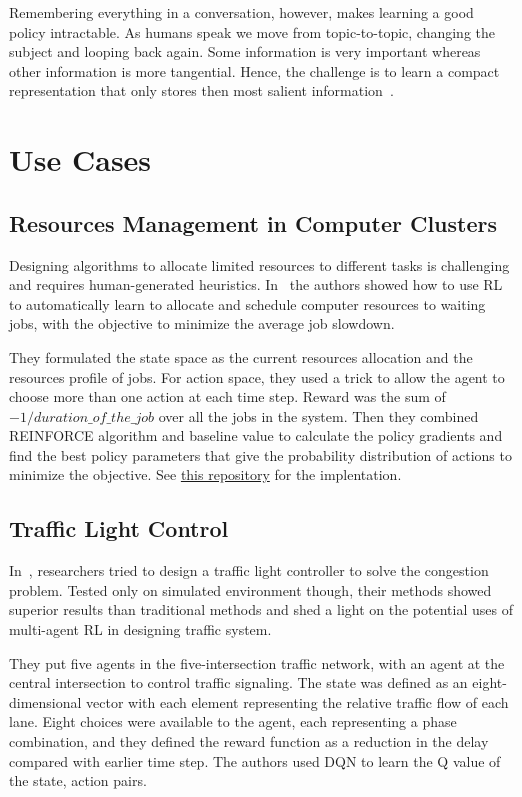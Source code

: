 \documentclass[letterpaper, 10 pt]{IEEEconf}
\begin{document}
Remembering everything in a conversation, however, makes learning a
good policy intractable. As humans speak we move from topic-to-topic,
changing the subject and looping back again. Some information is very
important whereas other information is more tangential. Hence, the
challenge is to learn a compact representation that only stores then
most salient information~\cite{microsoft_research_2018}.

\section{Use Cases}

\subsection{Resources Management in Computer Clusters}

Designing algorithms to allocate limited resources to different tasks
is challenging and requires human-generated
heuristics. In~\cite{mao2016resource} the authors showed how to use RL
to automatically learn to allocate and schedule computer resources to
waiting jobs, with the objective to minimize the average job slowdown.

They formulated the state space as the current resources allocation
and the resources profile of jobs. For action space, they used a trick
to allow the agent to choose more than one action at each time
step. Reward was the sum of $-1/duration\_of\_the\_job$ over all the
jobs in the system. Then they combined REINFORCE algorithm and
baseline value to calculate the policy gradients and find the best
policy parameters that give the probability distribution of actions to
minimize the objective. See
\href{https://github.com/hongzimao/deeprm}{this repository} for the
implentation.

\subsection{Traffic Light Control}

In~\cite{arel2010reinforcement}, researchers tried to design a traffic
light controller to solve the congestion problem. Tested only on
simulated environment though, their methods showed superior results
than traditional methods and shed a light on the potential uses of
multi-agent RL in designing traffic system.

They put five agents in the five-intersection traffic network, with an
agent at the central intersection to control traffic signaling. The
state was defined as an eight-dimensional vector with each element
representing the relative traffic flow of each lane. Eight choices
were available to the agent, each representing a phase combination,
and they defined the reward function as a reduction in the delay
compared with earlier time step. The authors used DQN to learn the Q
value of the {state, action} pairs.
\end{document}
